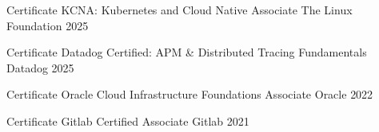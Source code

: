 

\begin{cvhonors}

\cvhonor
  {Certificate} %
  {KCNA: Kubernetes and Cloud Native Associate} %
  {The Linux Foundation} %
  {2025} %

\cvhonor
  {Certificate} %
  {Datadog Certified: APM & Distributed Tracing Fundamentals} %
  {Datadog} %
  {2025} %


\cvhonor
  {Certificate} %
  {Oracle Cloud Infrastructure Foundations Associate} %
  {Oracle} %
  {2022} %



  \cvhonor
    {Certificate} %
    {Gitlab Certified Associate} %
    {Gitlab} %
    {2021} %




\end{cvhonors}

